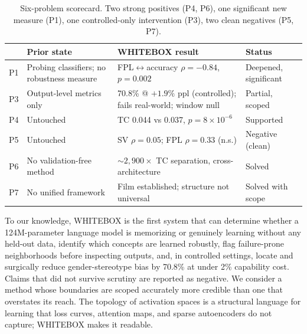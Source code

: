 \documentclass[10pt]{article}
\begin{document}
\begin{table}[t]
\centering
\small
\begin{tabular}{p{0.6cm}p{3.6cm}p{5.6cm}p{3.0cm}}
\toprule
 & Prior state & WHITEBOX result & Status \\
\midrule
P1 & Probing classifiers; no robustness measure & FPL$\leftrightarrow$accuracy $\rho=-0.84$, $p=0.002$ & Deepened, significant \\
P3 & Output-level metrics only & 70.8\% @ $+1.9\%$ ppl (controlled); fails real-world; window null & Partial, scoped \\
P4 & Untouched & TC 0.044 vs 0.037, $p=8\times10^{-6}$ & Supported \\
P5 & Untouched & SV $\rho=0.05$; FPL $\rho=0.33$ (n.s.) & Negative (clean) \\
P6 & No validation-free method & ${\sim}2{,}900\times$ TC separation, cross-architecture & Solved \\
P7 & No unified framework & Film established; structure not universal & Solved with scope \\
\bottomrule
\end{tabular}
\caption{Six-problem scorecard. Two strong positives (P4, P6), one significant new measure (P1), one controlled-only intervention (P3), two clean negatives (P5, P7).}
\label{tab:scorecard}
\end{table}

To our knowledge, WHITEBOX is the first system that can determine whether a 124M-parameter language model is memorizing or genuinely learning without any held-out data, identify which concepts are learned robustly, flag failure-prone neighborhoods before inspecting outputs, and, in controlled settings, locate and surgically reduce gender-stereotype bias by 70.8\% at under 2\% capability cost. Claims that did not survive scrutiny are reported as negative. We consider a method whose boundaries are scoped accurately more credible than one that overstates its reach. The topology of activation spaces is a structural language for learning that loss curves, attention maps, and sparse autoencoders do not capture; WHITEBOX makes it readable.
\end{document}
